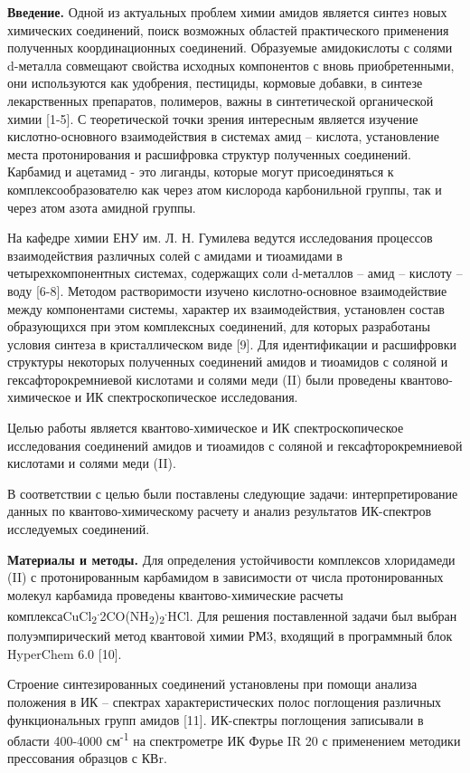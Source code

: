 \textbf{Введение.} Одной из актуальных проблем химии амидов является
синтез новых химических соединений, поиск возможных областей
практического применения полученных координационных соединений.
Образуемые амидокислоты с солями d-металла совмещают свойства исходных
компонентов с вновь приобретенными, они используются как удобрения,
пестициды, кормовые добавки, в синтезе лекарственных препаратов,
полимеров, важны в синтетической органической химии {[}1-5{]}. С
теоретической точки зрения интересным является изучение
кислотно-основного взаимодействия в системах амид -- кислота,
установление места протонирования и расшифровка структур полученных
соединений. Карбамид и ацетамид - это лиганды, которые могут
присоединяться к комплексообразователю как через атом кислорода
карбонильной группы, так и через атом азота амидной группы.

На кафедре химии ЕНУ им. Л. Н. Гумилева ведутся исследования процессов
взаимодействия различных солей с амидами и тиоамидами в
четырехкомпонентных системах, содержащих соли d-металлов -- амид --
кислоту -- воду {[}6-8{]}. Методом растворимости изучено
кислотно-основное взаимодействие между компонентами системы, характер их
взаимодействия, установлен состав образующихся при этом комплексных
соединений, для которых разработаны условия синтеза в кристаллическом
виде {[}9{]}. Для идентификации и расшифровки структуры некоторых
полученных соединений амидов и тиоамидов с соляной и
гексафторокремниевой кислотами и солями меди (II) были проведены
квантово-химическое и ИК спектроскопическое исследования.

Целью работы является квантово-химическое и ИК спектроскопическое
исследования соединений амидов и тиоамидов с соляной и
гексафторокремниевой кислотами и солями меди (II).

В соответствии с целью были поставлены следующие задачи:
интерпретирование данных по квантово-химическому расчету и анализ
результатов ИК-спектров исследуемых соединений.

\textbf{Материалы и методы.} Для определения устойчивости комплексов
хлоридамеди (II) с протонированным карбамидом в зависимости от числа
протонированных молекул карбамида проведены квантово-химические расчеты
комплексаCuCl\textsubscript{2}\textsuperscript{.}2CO(NH\textsubscript{2})\textsubscript{2}\textsuperscript{.}HCl.
Для решения поставленной задачи был выбран полуэмпирический метод
квантовой химии РМ3, входящий в программный блок HyperChem 6.0 {[}10{]}.

Строение синтезированных соединений установлены при помощи анализа
положения в ИК -- спектрах характеристических полос поглощения различных
функциональных групп амидов {[}11{]}. ИК-спектры поглощения записывали в
области 400-4000 см\textsuperscript{-1} на спектрометре ИК Фурье IR 20 с
применением методики прессования образцов с КВr.

